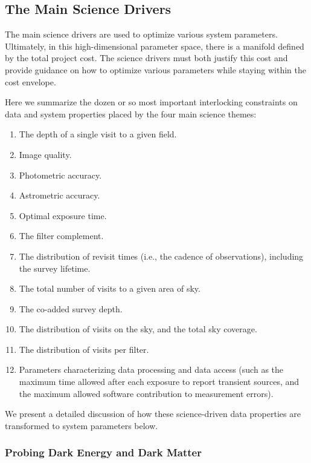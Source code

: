 \subsection{The Main Science Drivers}

The main science drivers are used to optimize various system parameters.
Ultimately, in this high-dimensional parameter space, there is a
manifold defined by the total project cost. The science
drivers must both justify this cost and provide guidance
on how to optimize various parameters while staying within the cost envelope.

Here we summarize the dozen or so most important interlocking constraints on data
and system properties placed by the four main science themes:

\begin{enumerate}
\item  The depth of a single visit to a given field.
\item  Image quality.
\item  Photometric accuracy.
\item  Astrometric accuracy.
\item  Optimal exposure time.
\item  The filter complement.
\item  The distribution of revisit times (i.e., the cadence of observations),
                including the survey lifetime.
\item  The total number of visits to a given area of sky.
\item  The co-added survey depth.
\item  The distribution of visits on the sky, and the total sky coverage.
\item  The distribution of visits per filter.
\item  Parameters characterizing data processing and data access
  (such as the maximum time allowed after each exposure to report
         transient sources, and the maximum allowed software
         contribution to measurement errors).
\end{enumerate}

We present a detailed discussion of how these science-driven data properties are
transformed to system parameters below.


\subsubsection{Probing Dark Energy and Dark Matter}
\label{sec:Dark_Energy}

